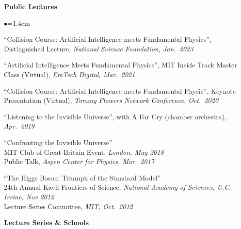 \documentclass[11pt]{article}
\newcommand{\sh}{\phantom{...}}
\newcommand{\bbl}{\begin{list}{$\bullet$}{\leftmargin=1.4em \itemsep=-1pt}}
\newcommand{\el}{\end{list}}
\begin{document}

\noindent \textbf{Public Lectures}


\bbl
\item ``Collision Course: Artificial Intelligence meets Fundamental Physics'', Distinguished Lecture, \textit{National Science Foundation, Jan.~2023}
\item ``Artificial Intelligence Meets Fundamental Physics'', MIT Inside Track Master Class (Virtual), \textit{EmTech Digital, Mar.~2021}
\item ``Collision Course: Artificial Intelligence meets Fundamental Physic'', Keynote Presentation (Virtual), \textit{Tommy Flowers Network Conference, Oct.~2020}
\item ``Listening to the Invisible Universe'', with A Far Cry (chamber orchestra), \textit{Apr.~2019}
\item ``Confronting the Invisible Universe''
\\ \sh MIT Club of Great Britain Event, \textit{London, May 2018}
\\ \sh Public Talk, \textit{Aspen Center for Physics, Mar.~2017}
\item ``The Higgs Boson: Triumph of the Standard Model''
\\ \sh 24th Annual Kavli Frontiers of Science, \textit{National Academy of Sciences, U.C. Irvine, Nov 2012}
\\ \sh Lecture Series Committee, \textit{MIT, Oct.~2012}
\el 


\noindent \textbf{Lecture Series \& Schools}
\end{document}
